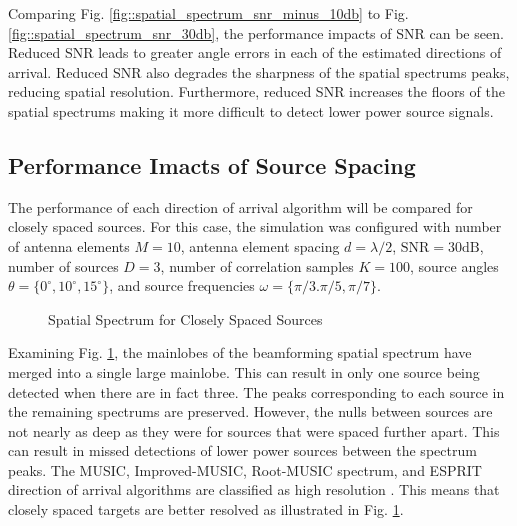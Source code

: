 \documentclass[conference]{IEEEtran}
\begin{document}
		Comparing Fig. \ref{fig::spatial_spectrum_snr_minus_10db} to Fig. \ref{fig::spatial_spectrum_snr_30db}, the performance impacts of SNR can be seen. Reduced SNR leads to greater angle errors in each of the estimated directions of arrival. Reduced SNR also degrades the sharpness of the spatial spectrums peaks, reducing spatial resolution. Furthermore, reduced SNR increases the floors of the spatial spectrums making it more difficult to detect lower power source signals.
		
		\subsection{Performance Imacts of Source Spacing}
		
		The performance of each direction of arrival algorithm will be compared for closely spaced sources. For this case, the simulation was configured with number of antenna elements $M=10$, antenna element spacing $d=\lambda/2$, $\text{SNR}=30\text{dB}$, number of sources $D=3$, number of correlation samples $K=100$, source angles $\theta = \{0^{\circ}, 10^{\circ}, 15^{\circ}\}$, and source frequencies $\omega = \{\pi/3. \pi/5, \pi/7\}$.
		
		\begin{figure}
			\centerline{}
			\caption{Spatial Spectrum for Closely Spaced Sources}
			\label{fig::closely_spaced_sources}
		\end{figure}
		
		Examining Fig. \ref{fig::closely_spaced_sources}, the mainlobes of the beamforming spatial spectrum have merged into a single large mainlobe. This can result in only one source being detected when there are in fact three. The peaks corresponding to each source in the remaining spectrums are preserved. However, the nulls between sources are not nearly as deep as they were for sources that were spaced further apart. This can result in missed detections of lower power sources between the spectrum peaks. The MUSIC, Improved-MUSIC, Root-MUSIC spectrum, and ESPRIT direction of arrival algorithms are classified as high resolution \cite{root_music_esprit_patwari}. This means that closely spaced targets are better resolved as illustrated in Fig. \ref{fig::closely_spaced_sources}.
		
\end{document}
